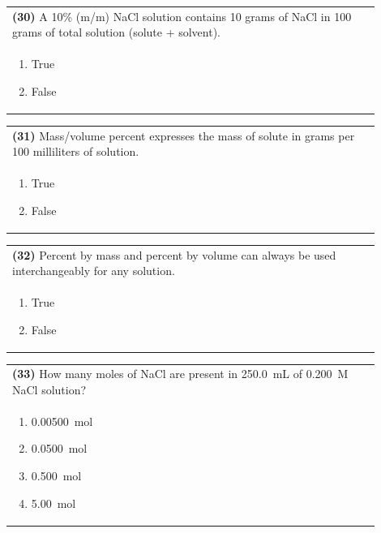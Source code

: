 \documentclass{article}
\begin{document}
\noindent\begin{tabular}{|p{0.9\linewidth}|}
\hline
\textbf{(30)} A 10\% (m/m) NaCl solution contains 10 grams of NaCl in 100 grams of total solution (solute + solvent).\\[0.2cm]
\begin{minipage}[t]{0.85\linewidth}
\begin{enumerate}[label=\alph*.]
\item True
\item False
\end{enumerate}
\end{minipage}\\[0.2cm]
\hline
\end{tabular}

\noindent\begin{tabular}{|p{0.9\linewidth}|}
\hline
\textbf{(31)} Mass/volume percent expresses the mass of solute in grams per 100 milliliters of solution.\\[0.2cm]
\begin{minipage}[t]{0.85\linewidth}
\begin{enumerate}[label=\alph*.]
\item True
\item False
\end{enumerate}
\end{minipage}\\[0.2cm]
\hline
\end{tabular}

\noindent\begin{tabular}{|p{0.9\linewidth}|}
\hline
\textbf{(32)} Percent by mass and percent by volume can always be used interchangeably for any solution.\\[0.2cm]
\begin{minipage}[t]{0.85\linewidth}
\begin{enumerate}[label=\alph*.]
\item True
\item False
\end{enumerate}
\end{minipage}\\[0.2cm]
\hline
\end{tabular}
\newpage

\vspace{0.2cm}
\noindent\begin{tabular}{|p{0.9\linewidth}|}
\hline
\textbf{(33)} How many moles of NaCl are present in 250.0~mL of 0.200~M NaCl solution?\\[0.2cm]
\begin{minipage}[t]{0.85\linewidth}
\begin{enumerate}[label=\alph*.]
\item 0.00500~mol
\item 0.0500~mol
\item 0.500~mol
\item 5.00~mol
\end{enumerate}
\end{minipage}\\[0.2cm]
\hline
\end{tabular}
\end{document}
